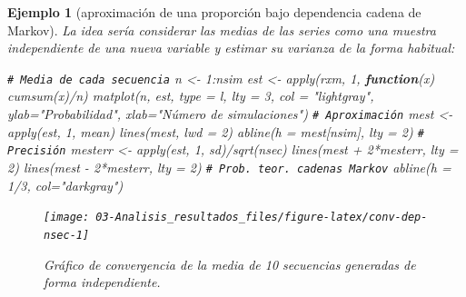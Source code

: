 \documentclass[
]{book}
\newenvironment{Shaded}{\begin{snugshade}}{\end{snugshade}}
\newcommand{\AttributeTok}[1]{\textcolor[rgb]{0.77,0.63,0.00}{#1}}
\newcommand{\CommentTok}[1]{\textcolor[rgb]{0.56,0.35,0.01}{\textit{#1}}}
\newcommand{\ControlFlowTok}[1]{\textcolor[rgb]{0.13,0.29,0.53}{\textbf{#1}}}
\newcommand{\DecValTok}[1]{\textcolor[rgb]{0.00,0.00,0.81}{#1}}
\newcommand{\FunctionTok}[1]{\textcolor[rgb]{0.00,0.00,0.00}{#1}}
\newcommand{\NormalTok}[1]{#1}
\newcommand{\OtherTok}[1]{\textcolor[rgb]{0.56,0.35,0.01}{#1}}
\newcommand{\SpecialCharTok}[1]{\textcolor[rgb]{0.00,0.00,0.00}{#1}}
\newcommand{\StringTok}[1]{\textcolor[rgb]{0.31,0.60,0.02}{#1}}
\theoremstyle{break}
\newtheorem{example}{Ejemplo}[chapter]
\theoremstyle{nonumberplain}
\renewcommand{\CommentTok}[1]{\textcolor[rgb]{0.41,0.41,0.41}{\texttt{#1}}}
\begin{document}
\begin{example}[aproximación de una proporción bajo dependencia cadena de Markov]
La idea sería considerar las medias de las series como una muestra independiente de una nueva variable y estimar su varianza de la forma habitual:

\begin{Shaded}
\begin{Highlighting}[]
\CommentTok{\# Media de cada secuencia}
\NormalTok{n }\OtherTok{\textless{}{-}} \DecValTok{1}\SpecialCharTok{:}\NormalTok{nsim}
\NormalTok{est }\OtherTok{\textless{}{-}} \FunctionTok{apply}\NormalTok{(rxm, }\DecValTok{1}\NormalTok{, }\ControlFlowTok{function}\NormalTok{(x) }\FunctionTok{cumsum}\NormalTok{(x)}\SpecialCharTok{/}\NormalTok{n)}
\FunctionTok{matplot}\NormalTok{(n, est, }\AttributeTok{type =} \StringTok{\textquotesingle{}l\textquotesingle{}}\NormalTok{, }\AttributeTok{lty =} \DecValTok{3}\NormalTok{, }\AttributeTok{col =} \StringTok{"lightgray"}\NormalTok{,}
     \AttributeTok{ylab=}\StringTok{"Probabilidad"}\NormalTok{, }\AttributeTok{xlab=}\StringTok{"Número de simulaciones"}\NormalTok{)}
\CommentTok{\# Aproximación}
\NormalTok{mest }\OtherTok{\textless{}{-}} \FunctionTok{apply}\NormalTok{(est, }\DecValTok{1}\NormalTok{, mean)}
\FunctionTok{lines}\NormalTok{(mest, }\AttributeTok{lwd =} \DecValTok{2}\NormalTok{)}
\FunctionTok{abline}\NormalTok{(}\AttributeTok{h =}\NormalTok{ mest[nsim], }\AttributeTok{lty =} \DecValTok{2}\NormalTok{)}
\CommentTok{\# Precisión}
\NormalTok{mesterr }\OtherTok{\textless{}{-}} \FunctionTok{apply}\NormalTok{(est, }\DecValTok{1}\NormalTok{, sd)}\SpecialCharTok{/}\FunctionTok{sqrt}\NormalTok{(nsec)}
\FunctionTok{lines}\NormalTok{(mest }\SpecialCharTok{+} \DecValTok{2}\SpecialCharTok{*}\NormalTok{mesterr, }\AttributeTok{lty =} \DecValTok{2}\NormalTok{)}
\FunctionTok{lines}\NormalTok{(mest }\SpecialCharTok{{-}} \DecValTok{2}\SpecialCharTok{*}\NormalTok{mesterr, }\AttributeTok{lty =} \DecValTok{2}\NormalTok{)}
\CommentTok{\# Prob. teor. cadenas Markov}
\FunctionTok{abline}\NormalTok{(}\AttributeTok{h =} \DecValTok{1}\SpecialCharTok{/}\DecValTok{3}\NormalTok{, }\AttributeTok{col=}\StringTok{"darkgray"}\NormalTok{)     }
\end{Highlighting}
\end{Shaded}

\begin{figure}[!htb]

{\centering \texttt{[image: 03-Analisis\_resultados\_files/figure-latex/conv-dep-nsec-1]} 

}

\caption{Gráfico de convergencia de la media de 10 secuencias generadas de forma independiente.}\label{fig:conv-dep-nsec}
\end{figure}


\end{example}
\end{document}
